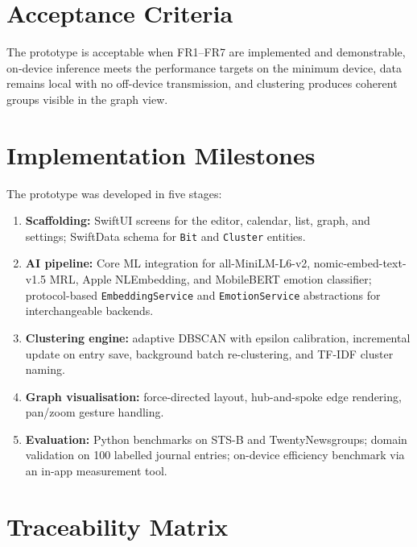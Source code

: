 \section{Acceptance Criteria}
The prototype is acceptable when FR1--FR7 are implemented and demonstrable, on‑device inference meets the performance targets on the minimum device, data remains local with no off-device transmission, and clustering produces coherent groups visible in the graph view.

\section{Implementation Milestones}
The prototype was developed in five stages:
\begin{enumerate}
  \item \textbf{Scaffolding:} SwiftUI screens for the editor, calendar, list, graph, and settings; SwiftData schema for \texttt{Bit} and \texttt{Cluster} entities.
  \item \textbf{AI pipeline:} Core ML integration for all-MiniLM-L6-v2, nomic-embed-text-v1.5 MRL, Apple NLEmbedding, and MobileBERT emotion classifier; protocol-based \texttt{EmbeddingService} and \texttt{EmotionService} abstractions for interchangeable backends.
  \item \textbf{Clustering engine:} adaptive DBSCAN with epsilon calibration, incremental update on entry save, background batch re-clustering, and TF-IDF cluster naming.
  \item \textbf{Graph visualisation:} force-directed layout, hub-and-spoke edge rendering, pan/zoom gesture handling.
  \item \textbf{Evaluation:} Python benchmarks on STS-B and TwentyNewsgroups; domain validation on 100 labelled journal entries; on-device efficiency benchmark via an in-app measurement tool.
\end{enumerate}

\section{Traceability Matrix}

